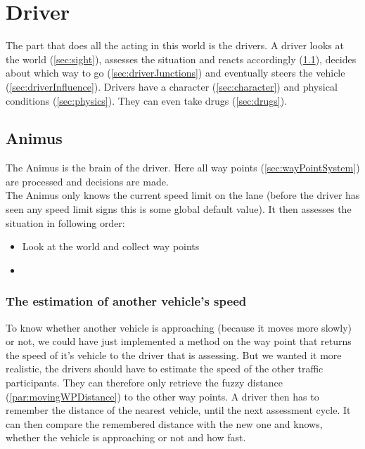 
\section{Driver}
\label{sec:driver}

The part that does all the acting in this world is the drivers. A
driver looks at the world (\ref{sec:sight}), assesses the situation
and reacts accordingly (\ref{sec:animus}), decides about which
way to go (\ref{sec:driverJunctions}) and eventually steers the
vehicle (\ref{sec:driverInfluence}). Drivers have a character
(\ref{sec:character}) and physical conditions (\ref{sec:physics}). They
can even take drugs (\ref{sec:drugs}). \\

\subsection{Animus}
\label{sec:animus}

The Animus is the brain of the driver. Here all way points 
(\ref{sec:wayPointSystem}) are processed and decisions are made. \\

\noindent The Animus only knows the current speed limit on the lane 
(before the driver has seen any speed limit signs this is some global
default value). It then assesses the situation in following order:

\begin{itemize}
\item Look at the world and collect way points
\item 
\end{itemize}

\subsubsection{The estimation of another vehicle's speed}

To know whether another vehicle is approaching (because it moves 
more slowly) or not, we could have just implemented a method on the
way point that returns the speed of it's vehicle to the driver that
is assessing. But we wanted it more realistic, the drivers should have
to estimate the speed of the other traffic participants. They can
therefore only retrieve the fuzzy distance (\ref{par:movingWPDistance})
to the other way points. A driver then has to remember the distance
of the nearest vehicle, until the next assessment cycle. It can then
compare the remembered distance with the new one and knows, whether the
vehicle is approaching or not and how fast.

